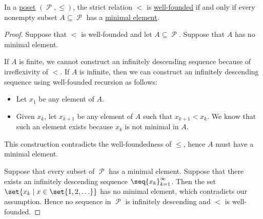 \begin{proposition}\label{thm:infinite_descent_partial_order}
  In a \hyperref[def:poset]{poset} \( (\mscrP, \leq) \), the strict relation \( < \) is \hyperref[def:well_founded_relation]{well-founded} if and only if every nonempty subset \( A \subseteq \mscrP \) has a \hyperref[def:poset_extremal_points/maximal_and_minimal_element]{minimal element}.
\end{proposition}
\begin{proof}
  \SufficiencySubProof Suppose that \( < \) is well-founded and let \( A \subseteq \mscrP \). Suppose that \( A \) has no minimal element.

  If \( A \) is finite, we cannot construct an infinitely descending sequence because of irreflexivity of \( < \). If \( A \) is infinite, then we can construct an infinitely descending sequence using well-founded recursion as follows:
  \begin{itemize}
    \item Let \( x_1 \) be any element of \( A \).
    \item Given \( x_k \), let \( x_{k+1} \) be any element of \( A \) such that \( x_{k+1} < x_k \). We know that such an element exists because \( x_k \) is not minimal in \( A \).
  \end{itemize}

  This construction contradicts the well-foundedness of  \( \leq \), hence \( A \) must have a minimal element.

  \NecessitySubProof Suppose that every subset of \( \mscrP \) has a minimal element. Suppose that there exists an infinitely descending sequence \( \seq{ x_k }_{k=1}^\infty \). Then the set \( \set{ x_k \given x \in \set{ 1, 2, \ldots } } \) has no minimal element, which contradicts our assumption. Hence no sequence in \( \mscrP \) is infinitely descending and \( < \) is well-founded.
\end{proof}

